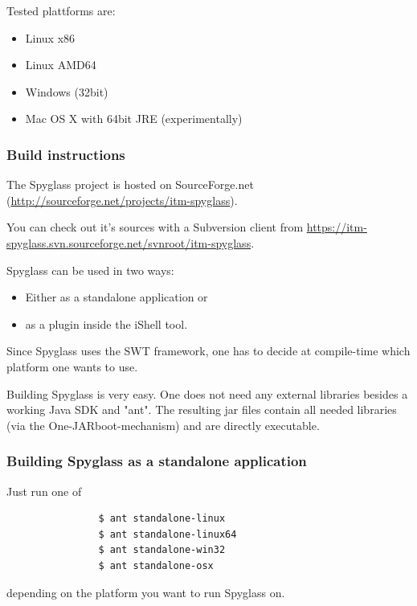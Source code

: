 			Tested plattforms are:

			\begin{itemize}
			  \item Linux x86
			  \item Linux AMD64
			  \item Windows (32bit)
			  \item Mac OS X with 64bit JRE (experimentally)
			\end{itemize}

		\subsubsection{Build instructions}
		
			The Spyglass project is hosted on SourceForge.net
			(\url{http://sourceforge.net/projects/itm-spyglass}).
			
			You can check out it’s sources with a Subversion client from
			\url{https://itm-spyglass.svn.sourceforge.net/svnroot/itm-spyglass}.

			Spyglass can be used in two ways:

			\begin{itemize}
			  \item{Either as a standalone application or}
			  \item{as a plugin inside the iShell tool.}
			\end{itemize}

			Since Spyglass uses the SWT framework, one has to
			decide at compile-time which platform one wants to use.

			Building Spyglass is very easy. One does not need any external
			libraries besides a working Java SDK and "ant".
			The resulting jar files contain all needed libraries (via the
			One-JAR\tm  boot-mechanism) and are directly executable.

		\subsubsection{Building Spyglass as a standalone application}

			Just run one of

			\begin{verbatim}
			    $ ant standalone-linux
			    $ ant standalone-linux64
			    $ ant standalone-win32
			    $ ant standalone-osx
			\end{verbatim}

			depending on the platform you want to run Spyglass on.

